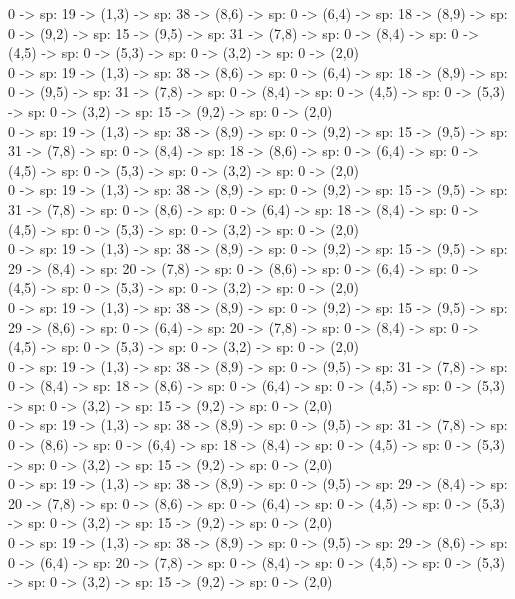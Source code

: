 \documentclass[10pt,a4paper]{article}
\begin{document}
0 -> sp: 19 -> (1,3) -> sp: 38 -> (8,6) -> sp: 0 -> (6,4) -> sp: 18 -> (8,9) -> sp: 0 -> (9,2) -> sp: 15 -> (9,5) -> sp: 31 -> (7,8) -> sp: 0 -> (8,4) -> sp: 0 -> (4,5) -> sp: 0 -> (5,3) -> sp: 0 -> (3,2) -> sp: 0 -> (2,0)\\

0 -> sp: 19 -> (1,3) -> sp: 38 -> (8,6) -> sp: 0 -> (6,4) -> sp: 18 -> (8,9) -> sp: 0 -> (9,5) -> sp: 31 -> (7,8) -> sp: 0 -> (8,4) -> sp: 0 -> (4,5) -> sp: 0 -> (5,3) -> sp: 0 -> (3,2) -> sp: 15 -> (9,2) -> sp: 0 -> (2,0)\\

0 -> sp: 19 -> (1,3) -> sp: 38 -> (8,9) -> sp: 0 -> (9,2) -> sp: 15 -> (9,5) -> sp: 31 -> (7,8) -> sp: 0 -> (8,4) -> sp: 18 -> (8,6) -> sp: 0 -> (6,4) -> sp: 0 -> (4,5) -> sp: 0 -> (5,3) -> sp: 0 -> (3,2) -> sp: 0 -> (2,0)\\

0 -> sp: 19 -> (1,3) -> sp: 38 -> (8,9) -> sp: 0 -> (9,2) -> sp: 15 -> (9,5) -> sp: 31 -> (7,8) -> sp: 0 -> (8,6) -> sp: 0 -> (6,4) -> sp: 18 -> (8,4) -> sp: 0 -> (4,5) -> sp: 0 -> (5,3) -> sp: 0 -> (3,2) -> sp: 0 -> (2,0)\\

0 -> sp: 19 -> (1,3) -> sp: 38 -> (8,9) -> sp: 0 -> (9,2) -> sp: 15 -> (9,5) -> sp: 29 -> (8,4) -> sp: 20 -> (7,8) -> sp: 0 -> (8,6) -> sp: 0 -> (6,4) -> sp: 0 -> (4,5) -> sp: 0 -> (5,3) -> sp: 0 -> (3,2) -> sp: 0 -> (2,0)\\

0 -> sp: 19 -> (1,3) -> sp: 38 -> (8,9) -> sp: 0 -> (9,2) -> sp: 15 -> (9,5) -> sp: 29 -> (8,6) -> sp: 0 -> (6,4) -> sp: 20 -> (7,8) -> sp: 0 -> (8,4) -> sp: 0 -> (4,5) -> sp: 0 -> (5,3) -> sp: 0 -> (3,2) -> sp: 0 -> (2,0)\\

0 -> sp: 19 -> (1,3) -> sp: 38 -> (8,9) -> sp: 0 -> (9,5) -> sp: 31 -> (7,8) -> sp: 0 -> (8,4) -> sp: 18 -> (8,6) -> sp: 0 -> (6,4) -> sp: 0 -> (4,5) -> sp: 0 -> (5,3) -> sp: 0 -> (3,2) -> sp: 15 -> (9,2) -> sp: 0 -> (2,0)\\

0 -> sp: 19 -> (1,3) -> sp: 38 -> (8,9) -> sp: 0 -> (9,5) -> sp: 31 -> (7,8) -> sp: 0 -> (8,6) -> sp: 0 -> (6,4) -> sp: 18 -> (8,4) -> sp: 0 -> (4,5) -> sp: 0 -> (5,3) -> sp: 0 -> (3,2) -> sp: 15 -> (9,2) -> sp: 0 -> (2,0)\\

0 -> sp: 19 -> (1,3) -> sp: 38 -> (8,9) -> sp: 0 -> (9,5) -> sp: 29 -> (8,4) -> sp: 20 -> (7,8) -> sp: 0 -> (8,6) -> sp: 0 -> (6,4) -> sp: 0 -> (4,5) -> sp: 0 -> (5,3) -> sp: 0 -> (3,2) -> sp: 15 -> (9,2) -> sp: 0 -> (2,0)\\

0 -> sp: 19 -> (1,3) -> sp: 38 -> (8,9) -> sp: 0 -> (9,5) -> sp: 29 -> (8,6) -> sp: 0 -> (6,4) -> sp: 20 -> (7,8) -> sp: 0 -> (8,4) -> sp: 0 -> (4,5) -> sp: 0 -> (5,3) -> sp: 0 -> (3,2) -> sp: 15 -> (9,2) -> sp: 0 -> (2,0)\\
\end{document}
